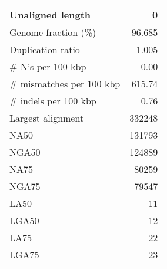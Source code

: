 \documentclass[12pt,a4paper]{article}
\begin{document}
\begin{table}[ht]
\begin{center}
\begin{tabular}{|l*{1}{|r}|}
Unaligned length & 0 \\ \hline
Genome fraction (\%) & 96.685 \\ \hline
Duplication ratio & 1.005 \\ \hline
\# N's per 100 kbp & 0.00 \\ \hline
\# mismatches per 100 kbp & 615.74 \\ \hline
\# indels per 100 kbp & 0.76 \\ \hline
Largest alignment & 332248 \\ \hline
NA50 & 131793 \\ \hline
NGA50 & 124889 \\ \hline
NA75 & 80259 \\ \hline
NGA75 & 79547 \\ \hline
LA50 & 11 \\ \hline
LGA50 & 12 \\ \hline
LA75 & 22 \\ \hline
LGA75 & 23 \\ \hline
\end{tabular}
\end{center}
\end{table}
\end{document}
